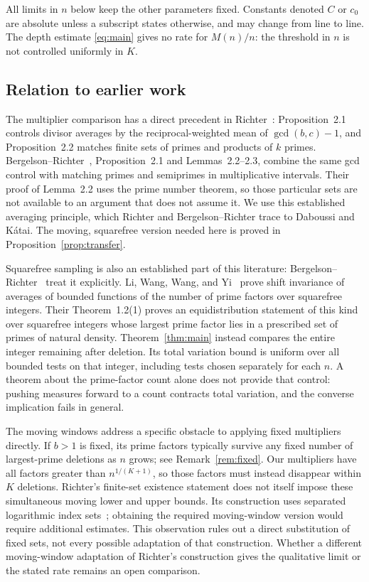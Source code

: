 \documentclass[11pt]{article}
\theoremstyle{remark}\newtheorem{remark}[theorem]{Remark}
\begin{document}
All limits in $n$ below keep the other parameters fixed. Constants denoted $C$ or $c_0$ are absolute unless a subscript states otherwise, and may change from line to line. The depth estimate \eqref{eq:main} gives no rate for $M(n)/n$: the threshold in $n$ is not controlled uniformly in $K$.

\subsection{Relation to earlier work}

The multiplier comparison has a direct precedent in Richter~\cite{Richter}: Proposition~2.1 controls divisor averages by the reciprocal-weighted mean of $\gcd(b,c)-1$, and Proposition~2.2 matches finite sets of primes and products of $k$ primes. Bergelson--Richter~\cite{BR}, Proposition~2.1 and Lemmas~2.2--2.3, combine the same gcd control with matching primes and semiprimes in multiplicative intervals. Their proof of Lemma~2.2 uses the prime number theorem, so those particular sets are not available to an argument that does not assume it. We use this established averaging principle, which Richter and Bergelson--Richter trace to Daboussi and K\'atai. The moving, squarefree version needed here is proved in Proposition~\ref{prop:transfer}.

Squarefree sampling is also an established part of this literature: Bergelson--Richter~\cite[Corollary~1.8]{BR} treat it explicitly. Li, Wang, Wang, and Yi~\cite[Theorem~1.7]{LWWY} prove shift invariance of averages of bounded functions of the number of prime factors over squarefree integers. Their Theorem~1.2(1) proves an equidistribution statement of this kind over squarefree integers whose largest prime factor lies in a prescribed set of primes of natural density. Theorem~\ref{thm:main} instead compares the entire integer remaining after deletion. Its total variation bound is uniform over all bounded tests on that integer, including tests chosen separately for each $n$. A theorem about the prime-factor count alone does not provide that control: pushing measures forward to a count contracts total variation, and the converse implication fails in general.

The moving windows address a specific obstacle to applying fixed multipliers directly. If $b>1$ is fixed, its prime factors typically survive any fixed number of largest-prime deletions as $n$ grows; see Remark~\ref{rem:fixed}. Our multipliers have all factors greater than $n^{1/(K+1)}$, so those factors must instead disappear within $K$ deletions. Richter's finite-set existence statement does not itself impose these simultaneous moving lower and upper bounds. Its construction uses separated logarithmic index sets~\cite[Section~3]{Richter}; obtaining the required moving-window version would require additional estimates. This observation rules out a direct substitution of fixed sets, not every possible adaptation of that construction. Whether a different moving-window adaptation of Richter's construction gives the qualitative limit or the stated rate remains an open comparison.
\end{document}
